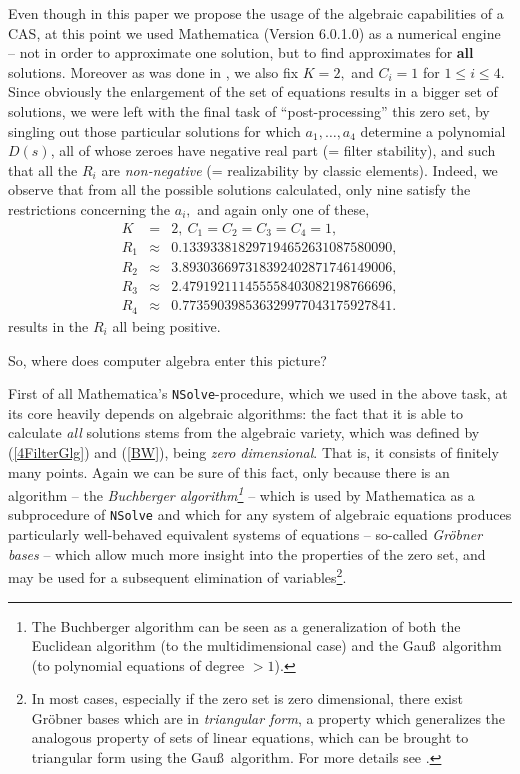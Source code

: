 \documentclass[10pt,twocolumn,pagenumbers]{IEEEtran}
\newcommand{\R}{\Bbb{R}}
\begin{document}
Even though in this paper we propose the usage of the algebraic capabilities of a CAS, at this point we used Mathematica (Version 6.0.1.0) as a numerical engine -- not in order to approximate one solution, but to find approximates for {\bf all} solutions. Moreover as was done in \cite{HieuDiss}, we also fix $K=2,$ and $C_i=1$ for $1\le i\le 4.$ Since obviously the enlargement of the set of equations results in a bigger set of solutions, we were left with the final task of ``post-processing'' this zero set, by singling out those particular solutions for which $a_1,\dots,a_4$ determine a polynomial $D(s)$, all of whose zeroes have negative real part (= filter stability), and such that all the $R_i$ are {\sl non-negative} (= realizability by classic elements). Indeed, we observe that from all the possible solutions calculated, only nine satisfy the restrictions concerning the $a_i,$ and again only one of these, 
\begin{eqnarray*}
K &=& 2,\ C_1=C_2=C_3=C_4=1,\\
R_1 &\approx& 0.133933818297194652631087580090,\\R_2 &\approx& 3.893036697318392402871746149006,\\R_3 &\approx& 2.479192111455558403082198766696,\\R_4 &\approx& 0.773590398536329977043175927841.\end{eqnarray*}
results in the $R_i$ all being positive.

So, where does computer algebra enter this picture?

First of all Mathematica's {\tt NSolve}-procedure, which we used in the above task, at its core heavily depends on algebraic algorithms: the fact that it is able to calculate {\sl all} solutions stems from the algebraic variety, which was defined by (\ref{4FilterGlg}) and (\ref{BW}), being {\sl zero dimensional}. That is, it consists of finitely many points.
Again we can be sure of this fact, only because there is an algorithm -- the {\sl Buchberger algorithm\footnote{The Buchberger algorithm can be seen as a generalization of both the Euclidean algorithm (to the multidimensional case) and the Gau\ss\ algorithm (to polynomial equations of degree $> 1$).}} -- which is used by Mathematica as a subprocedure of {\tt NSolve} and which for any system of algebraic equations produces particularly well-behaved equivalent systems of equations -- so-called {\sl Gr\"obner bases} -- which allow much more insight into the properties of the zero set, and may be used for a subsequent elimination of variables\footnote{In most cases, especially if the zero set is zero dimensional, there exist Gr\"obner bases which are in {\sl triangular form}, a property which generalizes the analogous property of sets of linear equations, which can be brought to triangular form using the Gau\ss\ algorithm. For more details see \cite{CoxIdeals,CoxUsing}.}. 
\end{document}
